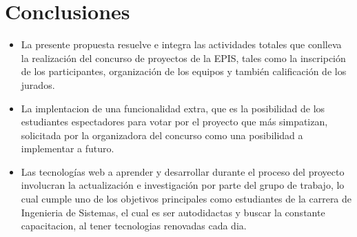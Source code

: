 \documentclass[%
 reprint,
 amsmath,amssymb,
 aps,
]{revtex4-1}
\begin{document}
\section{Conclusiones}

\begin{itemize}
\item La presente propuesta resuelve e integra las actividades totales que conlleva la realización del concurso de proyectos de la EPIS, tales como la inscripción de los participantes, organización de los equipos y también calificación de los jurados. 

\item La implentacion de una funcionalidad extra, que es la posibilidad de los estudiantes espectadores  para votar por el proyecto que más simpatizan,  solicitada por la organizadora del concurso como una posibilidad a implementar a futuro. 

\item Las tecnologías web a aprender y desarrollar durante el proceso del proyecto involucran la actualización e investigación por parte del grupo de trabajo, lo cual cumple uno de los objetivos principales como estudiantes de la carrera de Ingenieria de Sistemas, el cual es ser autodidactas y buscar la constante capacitacion, al tener tecnologias renovadas cada dia.
 

\end{itemize}


%
%
\end{document}
